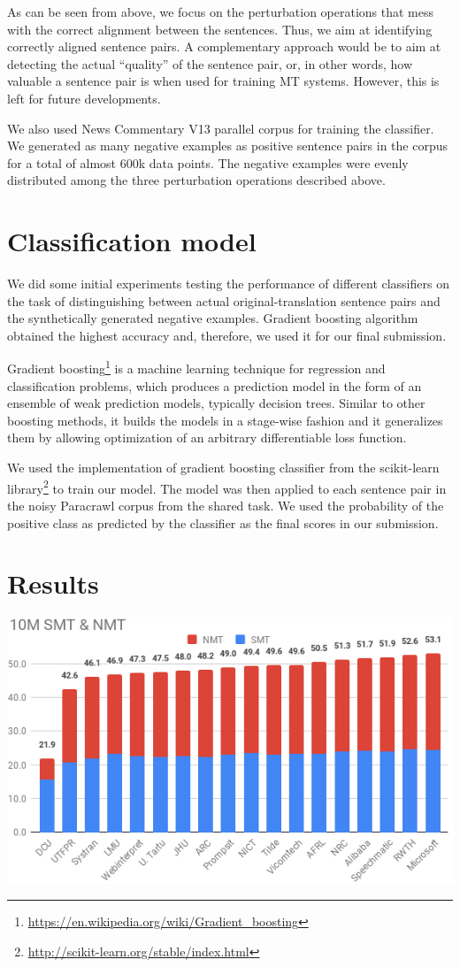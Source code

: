 \documentclass[a0]{sciposter}
\begin{document}
\begin{multicols*}{2}
As can be seen from above, we focus on the perturbation operations that mess with the correct alignment between the sentences. Thus, we aim at identifying correctly aligned sentence pairs. A complementary approach would be to aim at detecting the actual ``quality'' of the sentence pair, or, in other words, how valuable a sentence pair is when used for training MT systems. However, this is left for future developments.

We also used News Commentary V13 parallel corpus for training the classifier. We generated as many negative examples as positive sentence pairs in the corpus for a total of almost $600$k data points. The negative examples were evenly distributed among the three perturbation operations described above.

\section{Classification model}
We did some initial experiments testing the performance of different classifiers on the task of distinguishing between actual original-translation sentence pairs and the synthetically generated negative examples. Gradient boosting algorithm obtained the highest accuracy and, therefore, we used it for our final submission.

Gradient boosting\footnote{\url{https://en.wikipedia.org/wiki/Gradient_boosting}} is a machine learning technique for regression and classification problems, which produces a prediction model in the form of an ensemble of weak prediction models, typically decision trees. Similar to other boosting methods, it builds the models in a stage-wise fashion and it generalizes them by allowing optimization of an arbitrary differentiable loss function.

We used the implementation of gradient boosting classifier from the scikit-learn library\footnote{\url{http://scikit-learn.org/stable/index.html}} to train our model. The model was then applied to each sentence pair in the noisy Paracrawl corpus from the shared task. We used the probability of the positive class as predicted by the classifier as the final scores in our submission.


\section{Results}

\includegraphics[width=\columnwidth]{assets/10M_crop.png}


\end{multicols*}
\end{document}
